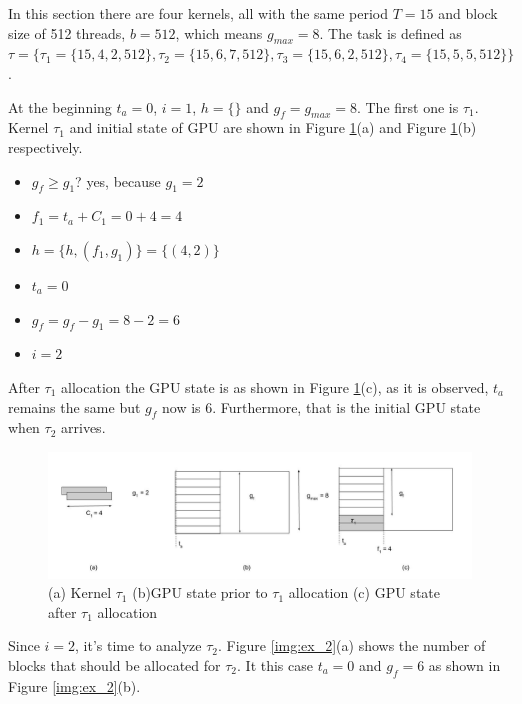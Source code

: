 \documentclass[
  12pt,
  a4paperpaper,
]{report}
\providecommand{\tightlist}{%
  \setlength{\itemsep}{0pt}\setlength{\parskip}{0pt}}
\begin{document}
In this section there are four kernels, all with the same
period \(T = 15\) and block size of 512 threads, \(b = 512\), which
means \(g_{max} = 8\). The task is defined as
\(\tau = \{\tau_1 = \{15, 4, 2, 512\} , \tau_2 = \{15, 6,7,512\}, \tau_3 = \{15, 6,2,512\}, \tau_4 =\{ 15, 5,5,512\} \}\).

At the beginning \(t_a =0\), \(i=1\), \(h=\{\}\) and
\(g_f = g_{max} = 8\). The first one is \(\tau_1\). Kernel \(\tau_1\)
and initial state of GPU are shown in Figure \ref{img:ex_1}(a) and Figure
\ref{img:ex_1}(b) respectively.

\begin{itemize}
\tightlist
\item
  \(g_f \geq g_1\)? yes, because \(g_1 = 2\)
\item
  \(f_1 = t_a + C_1 = 0 + 4 = 4\)
\item
  \(h = \{h, (f_1, g_1)\} = \{ (4,2) \}\)
\item
  \(t_a = 0\)
\item
  \(g_f = g_f - g_1 = 8 - 2 = 6\)
\item
  \(i = 2\)
\end{itemize}

After \(\tau_1\) allocation the GPU state is as shown in Figure
\ref{img:ex_1}(c), as it is observed, \(t_a\) remains the same but
\(g_f\) now is 6. Furthermore, that is the initial GPU state when
\(\tau_2\) arrives.

\begin{figure}
\centering
\includegraphics{source/figures/ex_1.jpg}
\caption{(a) Kernel \(\tau_1\) (b)GPU state prior to \(\tau_1\)
allocation (c) GPU state after \(\tau_1\) allocation \label{img:ex_1}}
\end{figure}

Since \(i=2\), it's time to analyze \(\tau_2\). Figure \ref{img:ex_2}(a)
shows the number of blocks that should be allocated for \(\tau_2\). It
this case \(t_a = 0\) and \(g_f = 6\) as shown in Figure
\ref{img:ex_2}(b).
\end{document}
